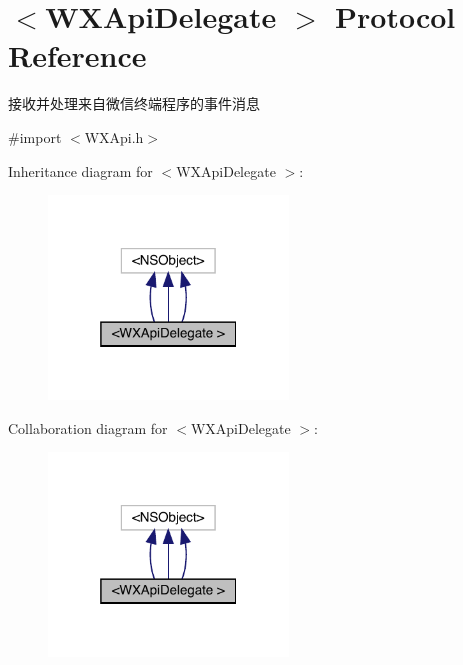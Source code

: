 \hypertarget{protocol_w_x_api_delegate_01-p}{}\section{$<$W\+X\+Api\+Delegate $>$ Protocol Reference}
\label{protocol_w_x_api_delegate_01-p}


接收并处理来自微信终端程序的事件消息  




{\ttfamily \#import $<$W\+X\+Api.\+h$>$}



Inheritance diagram for $<$W\+X\+Api\+Delegate $>$\+:\nopagebreak
\begin{figure}[H]
\begin{center}
\leavevmode
\includegraphics[width=181pt]{protocol_w_x_api_delegate_01-p__inherit__graph}
\end{center}
\end{figure}


Collaboration diagram for $<$W\+X\+Api\+Delegate $>$\+:\nopagebreak
\begin{figure}[H]
\begin{center}
\leavevmode
\includegraphics[width=181pt]{protocol_w_x_api_delegate_01-p__coll__graph}
\end{center}
\end{figure}
